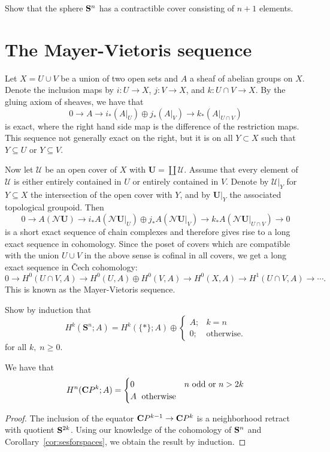 \documentclass[a4paper,openany]{scrbook}
\newcommand{\nerve}{\mathcal N}
\begin{document}
\begin{exer}
Show that the sphere $\S^n$ has a contractible cover consisting of $n+1$ elements.
\end{exer}



\section{The Mayer-Vietoris sequence}

Let $X=U \cup V$ be a union of two open sets and $A$ a sheaf of abelian groups on $X$. Denote the inclusion maps by $i\colon U \to X$, $j\colon V \to X$, and $k\colon U \cap V \to X$. By the gluing axiom of sheaves, we have that
\[
0 \to A \to i_*(A|_U) \oplus j_*(A|_V) \to k_*(A|_{U \cap V})
\]
is exact, where the right hand side map is the difference of the restriction maps. This sequence not generally exact on the right, but it is on all $Y \subset X$ such that $Y \subseteq U$ or $Y \subseteq V$.

Now let $\mathcal U$ be an open cover of $X$ with $\mathbf U = \coprod \mathcal U$. Assume that every element of $\mathcal U$ is either entirely contained in $U$ or entirely contained in $V$. Denote by $\mathcal U|_Y$ for $Y \subseteq X$ the intersection of the open cover with $Y$, and by $\mathbf U|_Y$ the associated topological groupoid. Then
\[
0 \to A(\nerve \mathbf U) \to i_*A(\nerve \mathbf U|_U) \oplus j_*A(\nerve \mathbf U|_V) \to k_*A(\nerve \mathbf U|_{U \cap V}) \to 0
\]
is a short exact sequence of chain complexes and therefore gives rise to a long exact sequence in cohomology. Since the poset of covers which are compatible with the union $U \cup V$ in the above sense is cofinal in all covers, we get a long exact sequence in \v Cech cohomology:
\[
0 \to H^0(U \cap V,A) \to H^0(U,A) \oplus H^0(V,A) \to H^0(X,A) \to H^1(U \cap V,A) \to \cdots.
\]
This is known as the Mayer-Vietoris sequence.

\begin{exer}\label{exer:cohomologyofspheres}
Show by induction that 
\[
H^k(\mathbf S^n;A) = H^k(\{*\};A) \oplus \begin{cases} A;& k=n\\ 0;& \text{otherwise.}\end{cases}
\]
for all $k,\;n \geq 0$.
\end{exer}

\begin{corollary}\label{cor:additivecohomologyofPn}
We have that
\[
H^n(\CP^k;A) = \begin{cases} 0\; & n \text{ odd or } n>2k\\ A\; \text{ otherwise}\end{cases}
\]
\end{corollary}
\begin{proof}
The inclusion of the equator $\CP^{k-1} \to \CP^k$ is a neighborhood retract with quotient $\S^{2k}$. Using our knowledge of the cohomology of $\S^n$ and Corollary~\ref{cor:sesforspaces}, we obtain the result by induction.
\end{proof}
\end{document}
